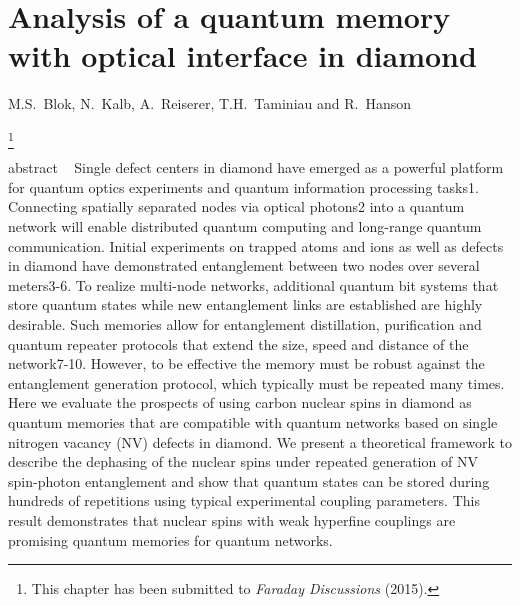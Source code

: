\graphicspath{{./ch_C13_dephasing_LDE/figures/}}


\chapter{Analysis of a quantum memory with optical interface in diamond }
\label{ch:CDL}

\begin{center} 
    \vspace{-1cm} {M.S.~Blok, N.~Kalb, A.~Reiserer, T.H.~Taminiau and R.~Hanson} 
\end{center}


{\renewcommand{\thefootnote}{}\footnote{This chapter has been submitted to
    {\em Faraday Discussions} (2015).}}


\vspace{-0.5cm} 
abstract ~\cite{Gao_NatPhoton_2015,Kimble_Nature_2008,Moehring_Nature_2007,Ritter_Nature_2012,Hofmann_Science_2012,Bernien_Nature_2013,Bennett_Phys.Rev.Lett._1996,Campbell_Phys.Rev.Lett._2008,Briegel_Phys.Rev.Lett._1998,Childress_Phys.Rev.Lett._2006,Childress__2013,Togan_Nature_2010,Bernien_Nature_2013,Pfaff_Science_2014,Jelezko_Phys.Rev.Lett._2004,Dutt_Science_2007,Neumann_Science_2008a,Smeltzer_Phys.Rev.A_2009,Fuchs_NatPhys_2011,vanderSar_Nature_2012,Taminiau_Phys.Rev.Lett._2012,Maurer_Science_2012,Tamarat_NewJ.Phys._2008,Robledo_Nature_2011,Togan_Nature_2010,Kolkowitz_Phys.Rev.Lett._2012,Zhao_NatNano_2012,Taminiau_NatNano_2014,Barrett_Phys.Rev.A_2005}
Single defect centers in diamond have emerged as a powerful platform for quantum optics experiments and quantum information processing tasks1. Connecting spatially separated nodes via optical photons2 into a quantum network will enable distributed quantum computing and long-range quantum communication. Initial experiments on trapped atoms and ions as well as defects in diamond have demonstrated entanglement between two nodes over several meters3-6. To realize multi-node networks, additional quantum bit systems that store quantum states while new entanglement links are established are highly desirable. Such memories allow for entanglement distillation, purification and quantum repeater protocols that extend the size, speed and distance of the network7-10. However, to be effective the memory must be robust against the entanglement generation protocol, which typically must be repeated many times. Here we evaluate the prospects of using carbon nuclear spins in diamond as quantum memories that are compatible with quantum networks based on single nitrogen vacancy (NV) defects in diamond. We present a theoretical framework to describe the dephasing of the nuclear spins under repeated generation of NV spin-photon entanglement and show that quantum states can be stored during hundreds of repetitions using typical experimental coupling parameters. This result demonstrates that nuclear spins with weak hyperfine couplings are promising quantum memories for quantum networks.
\clearpage

